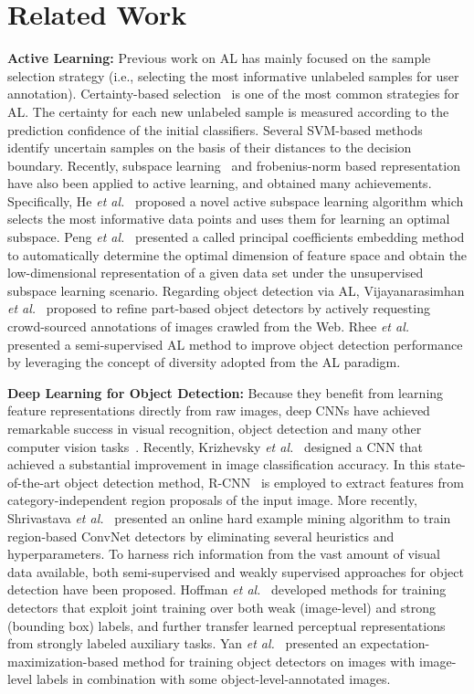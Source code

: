 \documentclass[journal]{IEEEtran}
\begin{document}
\section{Related Work}
\label{sec:related_work}
\textbf{Active Learning:} 
{Previous} work on AL {has mainly focused} on the sample selection strategy (i.e., selecting the most informative unlabeled samples for user annotation). Certainty-based selection~\cite{lewis1994sequential,tong2002support} is one of the most common {strategies} for AL. The certainty for {each new unlabeled sample} is measured according to the prediction confidence of the initial classifiers. Several SVM-based methods~\cite{tong2002support} {identify uncertain samples on the basis} of their distances to the decision boundary. {Recently, subspace learning~\cite{activesubspace,asl17tcyb} and frobenius-norm based representation~\cite{cb18tnnls} have also been applied to active learning, and obtained many achievements. Specifically, He {\em et al.}~\cite{activesubspace} proposed a novel active subspace learning algorithm which selects the most informative data points and uses them for learning an optimal subspace. Peng {\em et al.}~\cite{asl17tcyb} presented a called principal coefficients embedding method to automatically determine the optimal dimension of feature space and obtain the low-dimensional representation of a given data set under the unsupervised subspace learning scenario.} Regarding object detection via AL, Vijayanarasimhan {\em et al.}~\cite{llal11CVPR} proposed to refine part-based object detectors by actively requesting crowd-sourced annotations of images crawled from the Web. Rhee {\em et al.}~\cite{id17CSR} presented a {semi-supervised AL} method to improve object detection performance by leveraging the concept of diversity adopted from the AL paradigm. 

\textbf{Deep Learning for Object Detection:}
Because they benefit from learning feature representations directly from raw images, deep CNNs have achieved remarkable success in visual recognition, object detection and many other computer vision tasks~\cite{a1b,ob}. Recently, Krizhevsky {\em et al.}~\cite{alexnet12NIPS} designed a CNN that achieved a substantial improvement in image classification accuracy. In this state-of-the-art object detection method, R-CNN~\cite{rcnn14CVPR} is employed to extract features from category-independent region proposals of the input image. More recently, Shrivastava {\em et al.}~\cite{ohem2016cvpr} presented an online hard example mining algorithm to train region-based ConvNet detectors by eliminating several heuristics and hyperparameters. To harness rich information from the vast amount of visual data available, both semi-supervised and weakly supervised approaches for object detection have been proposed. Hoffman {\em et al.}~\cite{Hoffman_2015_CVPR} developed methods for training detectors that exploit joint training over both weak (image-level) and strong (bounding box) labels, and further transfer learned perceptual representations from strongly labeled auxiliary tasks. Yan {\em et al.}~\cite{em17} presented an expectation-maximization-based method for training object detectors on images with image-level labels in combination with some object-level-annotated images.
\end{document}
